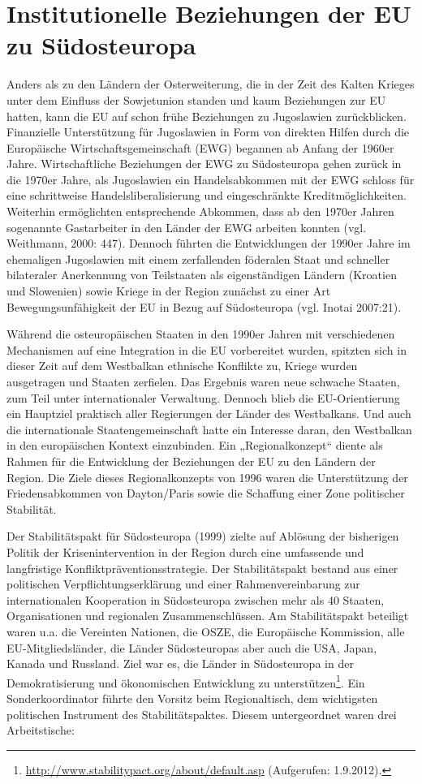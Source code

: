\section{Institutionelle Beziehungen der EU zu Südosteuropa}
Anders als zu den Ländern der Osterweiterung, die in der Zeit des Kalten Krieges unter dem Einfluss der Sowjetunion standen und kaum Beziehungen zur EU hatten, kann die EU auf schon frühe Beziehungen zu Jugoslawien zurückblicken. Finanzielle Unterstützung für Jugoslawien in Form von direkten Hilfen durch die Europäische Wirtschaftsgemeinschaft (EWG) begannen ab Anfang der 1960er Jahre. Wirtschaftliche Beziehungen der EWG zu Südosteuropa gehen zurück in die 1970er Jahre, als Jugoslawien ein Handelsabkommen mit der EWG schloss für eine schrittweise Handelsliberalisierung und eingeschränkte Kreditmöglichkeiten. Weiterhin ermöglichten entsprechende Abkommen, dass ab den 1970er Jahren sogenannte Gastarbeiter in den Länder der EWG arbeiten konnten (vgl. Weithmann, 2000: 447). Dennoch führten die Entwicklungen der 1990er Jahre im ehemaligen Jugoslawien mit einem zerfallenden föderalen Staat und schneller bilateraler Anerkennung von Teilstaaten als eigenständigen Ländern (Kroatien und Slowenien) sowie Kriege in der Region zunächst zu einer Art Bewegungsunfähigkeit der EU in Bezug auf Südosteuropa (vgl. Inotai 2007:21).\par
Während die osteuropäischen Staaten in den 1990er Jahren mit verschiedenen Mechanismen auf eine Integration in die EU vorbereitet wurden, spitzten sich in dieser Zeit auf dem Westbalkan ethnische Konflikte zu, Kriege wurden ausgetragen und Staaten zerfielen. Das Ergebnis waren neue schwache Staaten, zum Teil unter internationaler Verwaltung. Dennoch blieb die EU-Orientierung ein Hauptziel praktisch aller Regierungen der Länder des Westbalkans. Und auch die internationale Staatengemeinschaft hatte ein Interesse daran, den Westbalkan in den europäischen Kontext einzubinden. Ein „Regionalkonzept“ diente als Rahmen für die Entwicklung der Beziehungen der EU zu den Ländern der Region. Die Ziele dieses Regionalkonzepts von 1996 waren die Unterstützung der Friedensabkommen von Dayton/Paris sowie die Schaffung einer Zone politischer Stabilität.\par
Der Stabilitätspakt für Südosteuropa (1999) zielte auf Ablösung der bisherigen Politik der Krisenintervention in der Region durch eine umfassende und langfristige Konfliktpräventionsstrategie. Der Stabilitätspakt bestand aus einer politischen Verpflichtungserklärung und einer Rahmenvereinbarung zur internationalen Kooperation in Südosteuropa zwischen mehr als 40 Staaten, Organisationen und regionalen Zusammenschlüssen. Am Stabilitätspakt beteiligt waren u.a. die Vereinten Nationen, die OSZE, die Europäische Kommission, alle EU-Mitgliedsländer, die Länder Südosteuropas aber auch die USA, Japan, Kanada und Russland. Ziel war es, die Länder in Südosteuropa in der Demokratisierung und ökonomischen Entwicklung zu unterstützen\footnote{\url{http://www.stabilitypact.org/about/default.asp} (Aufgerufen: 1.9.2012).}. Ein Sonderkoordinator führte den Vorsitz beim Regionaltisch, dem wichtigsten politischen Instrument des Stabilitätspaktes. Diesem untergeordnet waren drei Arbeitstische:
